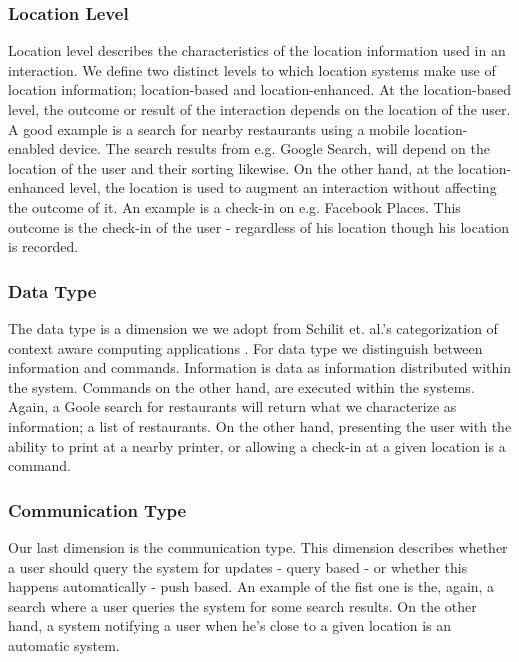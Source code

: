 \subsubsection{Location Level}
Location level describes the characteristics of the location information used in an interaction. We define two distinct levels to which location systems make use of location information; location-based and location-enhanced. At the location-based level, the outcome or result of the interaction depends on the location of the user. A good example is a search for nearby restaurants using a mobile location-enabled device. The search results from e.g. Google Search, will depend on the location of the user and their sorting likewise. On the other hand, at the location-enhanced level, the location is used to augment an interaction without affecting the outcome of it. An example is a check-in on e.g. Facebook Places. This outcome is the check-in of the user - regardless of his location though his location is recorded.

\subsubsection{Data Type}
The data type is a dimension we we adopt from Schilit et. al.'s categorization of context aware computing applications \cite{512740}. For data type we distinguish between information and commands. Information is data as information distributed within the system. Commands on the other hand, are executed within the systems. Again, a Goole search for restaurants will return what we characterize as information; a list of restaurants. On the other hand, presenting the user with the ability to print at a nearby printer, or allowing a check-in at a given location is a command.

\subsubsection{Communication Type}
\label{sub:communication.type}
Our last dimension is the communication type. This dimension describes whether a user should query the system for updates - query based -  or whether this happens automatically - push based. An example of the fist one is the, again, a search where a user queries the system for some search results. On the other hand, a system notifying a user when he's close to a given location is an automatic system.  



